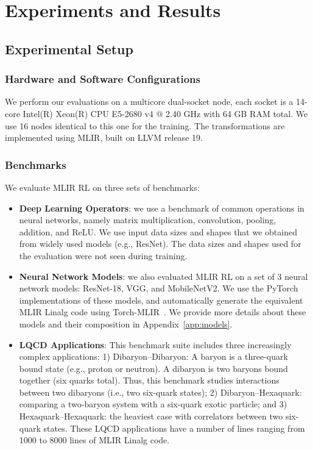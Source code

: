 \documentclass[10pt,twocolumn]{article}
\begin{document}
\section{Experiments and Results}

\subsection{Experimental Setup}

\subsubsection{Hardware and Software Configurations}
We perform our evaluations on a multicore dual-socket node, each socket is a 14-core Intel(R) Xeon(R) CPU E5-2680 v4 @ 2.40 GHz with 64 GB RAM total. We use 16 nodes identical to this one for the training. The transformations are implemented using MLIR, built on LLVM release 19.

\subsubsection{Benchmarks}
We evaluate MLIR RL on three sets of benchmarks:

\begin{itemize}
\item \textbf{Deep Learning Operators}: we use a benchmark of common operations in neural networks, namely matrix multiplication, convolution, pooling, addition, and ReLU. We use input data sizes and shapes that we obtained from widely used models (e.g., ResNet). The data sizes and shapes used for the evaluation were not seen during training.
\item \textbf{Neural Network Models}: we also evaluated MLIR RL on a set of 3 neural network models: ResNet-18, VGG, and MobileNetV2. We use the PyTorch implementations of these models, and automatically generate the equivalent MLIR Linalg code using Torch-MLIR~\cite{ref54}. We provide more details about these models and their composition in Appendix~\ref{app:models}.
\item \textbf{LQCD Applications}: This benchmark suite includes three increasingly complex applications: 1) Dibaryon--Dibaryon: A baryon is a three-quark bound state (e.g., proton or neutron). A dibaryon is two baryons bound together (six quarks total). Thus, this benchmark studies interactions between two dibaryons (i.e., two six-quark states); 2) Dibaryon--Hexaquark: comparing a two-baryon system with a six-quark exotic particle; and 3) Hexaquark--Hexaquark: the heaviest case with correlators between two six-quark states. These LQCD applications have a number of lines ranging from 1000 to 8000 lines of MLIR Linalg code.
\end{itemize}
\end{document}
